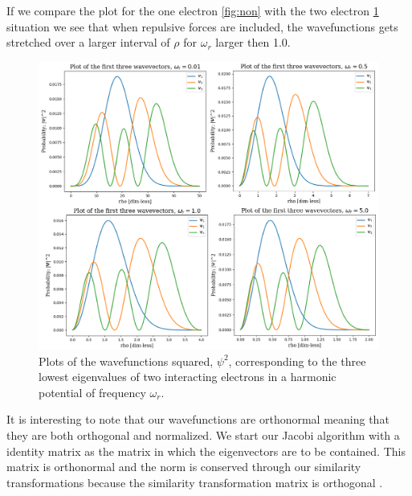 \documentclass[12pt]{article}
\numberwithin{figure}{section}
\numberwithin{table}{section}
\begin{document}
\noindent If we compare the plot for the one electron \ref{fig:non} with the two electron \ref{fig:interacting} situation we see that when repulsive forces are included, the wavefunctions gets stretched over a larger interval of $\rho$ for $\omega_r$ larger then 1.0. \\


\begin{figure}[ht]
	\centerline{\includegraphics[scale = 0.52]{interacting_combined.png}}
	\caption{Plots of the wavefunctions squared, $\psi^2$, corresponding to the three lowest eigenvalues of two interacting electrons in a harmonic potential of frequency $\omega_r$. }
    \label{fig:interacting}
\end{figure}

\noindent It is interesting to note that our wavefunctions are orthonormal meaning that they are both orthogonal and normalized. We start our Jacobi algorithm with a identity matrix as the matrix in which the eigenvectors are to be contained. This matrix is orthonormal and the norm is conserved through our similarity transformations because the similarity transformation matrix is orthogonal \cite{LinAlg}. \\ 
\end{document}
